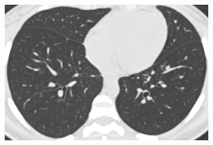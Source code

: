 \begin{figure}[htbp] 
\centering
\begin{subfigure}{.4\linewidth}%
  \includegraphics[width=\linewidth,trim={{.0\wd0} {.0\wd0} {.0\wd0} {.0\wd0}},clip]{Segmentation/Image/LungSegmentationBefore.png}
  \caption{}
  \label{fig:LungSegmentation-a} 
\end{subfigure}
\begin{subfigure}{.4\linewidth}%

\end{subfigure}
\end{figure}
